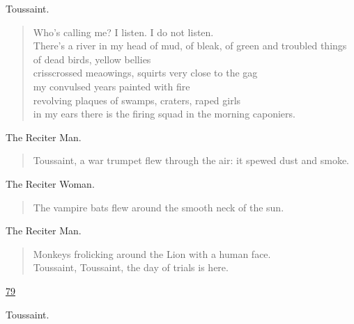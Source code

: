 \documentclass[letterpaper,article,12pt,oneside,notitlepage]{memoir}
\begin{document}
\begin{center}Toussaint.\end{center}

\begin{verse}
Who's calling me? I listen. I do not listen. \\
There's a river in my head of mud, of bleak, of green and troubled things  \\
of dead birds, yellow bellies \\
crisscrossed meaowings, squirts very close to the gag \\
my convulsed years painted with fire \\
revolving plaques of swamps, craters, raped girls \\
in my ears there is the firing squad in the morning caponiers. \\
\end{verse}

\begin{center}The Reciter Man.\end{center}

\begin{verse}
\indent Toussaint, a war trumpet flew through the air: it spewed dust and smoke. \\
\end{verse}

\begin{center}The Reciter Woman.\end{center}

\begin{verse}
\hspace{1cm} The vampire bats flew around the smooth neck of the sun. \\
\end{verse}

\begin{center}The Reciter Man.\end{center}

\begin{verse}
Monkeys frolicking around the Lion with a human face. \\
Toussaint, Toussaint, the day of trials is here. \\
\end{verse}

\clearpage

\href{http://cesaire.elotroalex.com/chiens/chiens/p079.html}{79}

\begin{center}Toussaint.\end{center}
\end{document}
